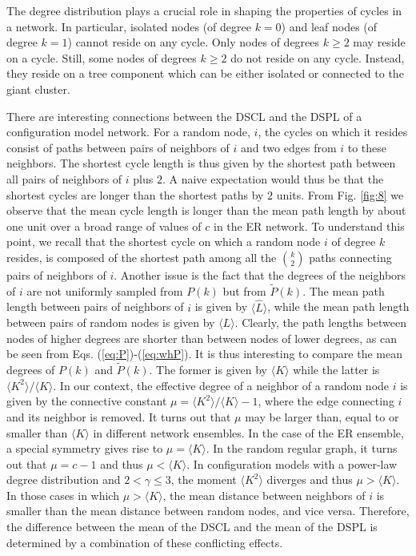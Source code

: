 \documentclass[preprint,pre,superscriptaddress,showpacs]{revtex4}
\begin{document}
The degree distribution plays a crucial role in shaping the properties
of cycles in a network. In particular, isolated nodes (of degree $k=0$)
and leaf nodes (of degree $k=1$) cannot reside on any cycle.
Only nodes of degrees $k \ge 2$ may reside on a cycle.
Still, some nodes of degrees $k \ge 2$ do not reside on 
any cycle. Instead, they reside on a tree component which can be
either isolated or connected to the giant cluster.

There are interesting connections between the DSCL and the DSPL
of a configuration model network.
For a random node, $i$, the cycles on which it resides consist
of paths between pairs of neighbors of $i$ and two edges from
$i$ to these neighbors.
The shortest cycle length is thus given by the shortest path
between all pairs of neighbors of $i$ plus $2$.
A naive expectation would thus be that the shortest
cycles are longer than the shortest paths by $2$ units.
From Fig. \ref{fig:8} we observe that the mean cycle length
is longer than the mean path length by about one unit over
a broad range of values of $c$ in the ER network.
To understand this point, we recall that the shortest cycle
on which a random node $i$ of degree $k$ resides, is composed of
the shortest path among all the $\binom{k}{2}$ paths connecting
pairs of neighbors of $i$. 
Another issue is the fact that the degrees of the 
neighbors of $i$ are not uniformly sampled from $P(k)$ but
from $\widetilde P(k)$.
The mean path length between pairs of neighbors of $i$ is
given by $\langle {\widehat L} \rangle$, while the mean
path length between pairs of random nodes is given by
$\langle L \rangle$.
Clearly, the path lengths between nodes of higher degrees
are shorter than between nodes of lower degrees, as
can be seen from Eqs. 
(\ref{eq:P})-(\ref{eq:whP}).
It is thus interesting to compare the mean degrees of
$P(k)$ and $\widetilde P(k)$.
The former is given by $\langle K \rangle$ while the
latter is $\langle K^2 \rangle / \langle K \rangle$.
In our context, the effective degree of a neighbor of a random node $i$
is given by the connective constant 
$\mu = \langle K^2 \rangle / \langle K \rangle - 1$,
where the edge connecting $i$ and its neighbor is removed.
It turns out that $\mu$ may be larger than, equal to or smaller than
$\langle K \rangle$ in different network ensembles. 
In the case of the ER ensemble, a special symmetry gives rise to
$\mu = \langle K \rangle$.
In the random regular graph, it turns out that $\mu = c-1$ and 
thus $\mu < \langle K \rangle$.
In configuration models with a power-law degree distribution
and $2 < \gamma \le 3$,
the moment
$\langle K^2 \rangle$ diverges and
thus 
$\mu > \langle K \rangle$.
In those cases in which 
$\mu > \langle K \rangle$,
the mean distance between neighbors of $i$ 
is smaller than the mean distance between random nodes,
and vice versa.
Therefore, the difference between the mean of the DSCL and 
the mean of the DSPL is determined by a combination of these
conflicting effects.
\end{document}
